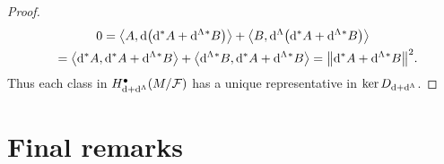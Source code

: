\documentclass[pdftex]{sigma}
\numberwithin{equation}{section}
\begin{document}
\begin{proof}
\begin{gather*}
0=\big\langle A,{\rm d}\big({\rm d}^*A+{\rm d}^{\Lambda}{}^*B\big)\big\rangle+\big\langle B,{\rm d}^{\Lambda} \big({\rm d}^*A+{\rm d}^{\Lambda}{}^*B\big)\big\rangle \\
\hphantom{0}{} =\big\langle {\rm d}^*A,{\rm d}^*A+{\rm d}^{\Lambda}{}^*B\big\rangle+\big\langle {\rm d}^{\Lambda}{}^*B,{\rm d}^*A+{\rm d}^{\Lambda}{}^*B\big\rangle =\big\|{\rm d}^*A+{\rm d}^{\Lambda}{}^*B\big\|^2.
\end{gather*}
Thus each class in $H^{\bullet}_{{\rm d}+{\rm d}^{\Lambda}}(M\slash\mathcal{F})$ has a unique representative in $\ker D_{{\rm d}+{\rm d}^{\Lambda}}$.
\end{proof}

\section{Final remarks}
\end{document}
